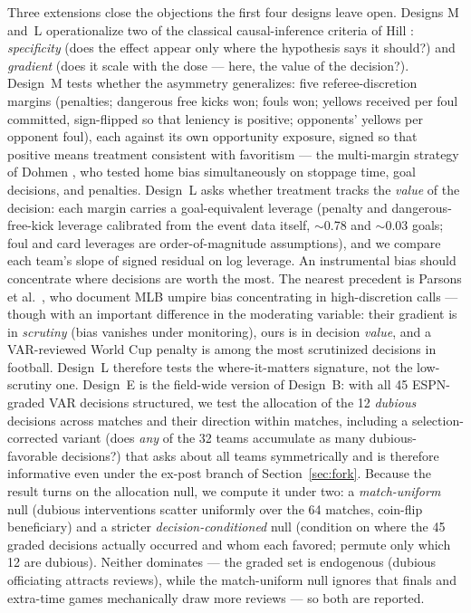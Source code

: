 \documentclass[11pt,a4paper]{article}
\begin{document}
Three extensions close the objections the first four designs leave open. Designs M
and~L operationalize two of the classical causal-inference criteria of
Hill \cite{hill1965}: \emph{specificity} (does the effect appear only where the
hypothesis says it should?) and \emph{gradient} (does it scale with the dose ---
here, the value of the decision?). Design~M
tests whether the asymmetry generalizes: five referee-discretion margins (penalties;
dangerous free kicks won; fouls won; yellows received per foul committed,
sign-flipped so that leniency is positive; opponents' yellows per opponent foul),
each against its own opportunity exposure, signed so that positive means treatment
consistent with favoritism --- the multi-margin strategy of Dohmen \cite{dohmen2008}, who
tested home bias simultaneously on stoppage time, goal decisions, and penalties.
Design~L asks whether treatment tracks the \emph{value}
of the decision: each margin carries a goal-equivalent leverage (penalty and
dangerous-free-kick leverage calibrated from the event data itself, $\sim$0.78 and
$\sim$0.03 goals; foul and card leverages are order-of-magnitude assumptions), and we
compare each team's slope of signed residual on log leverage. An instrumental bias
should concentrate where decisions are worth the most. The nearest precedent is
Parsons et al.\ \cite{parsons2011}, who document MLB umpire bias concentrating in
high-discretion calls --- though with an important difference in the moderating
variable: their gradient is in \emph{scrutiny} (bias vanishes under monitoring),
ours is in decision \emph{value}, and a VAR-reviewed World Cup penalty is among the
most scrutinized decisions in football. Design~L therefore tests the
where-it-matters signature, not the low-scrutiny one. Design~E is the field-wide
version of Design~B: with all 45 ESPN-graded VAR decisions structured, we test the
allocation of the 12 \emph{dubious} decisions across matches and their direction
within matches, including a selection-corrected variant (does \emph{any} of the 32
teams accumulate as many dubious-favorable decisions?) that asks about all teams
symmetrically and is therefore informative even under the ex-post branch of
Section~\ref{sec:fork}. Because the result turns on the allocation null, we compute
it under two: a \emph{match-uniform} null (dubious interventions scatter uniformly
over the 64 matches, coin-flip beneficiary) and a stricter \emph{decision-conditioned}
null (condition on where the 45 graded decisions actually occurred and whom each
favored; permute only which 12 are dubious). Neither dominates --- the graded set is
endogenous (dubious officiating attracts reviews), while the match-uniform null
ignores that finals and extra-time games mechanically draw more reviews --- so both
are reported.
\end{document}
